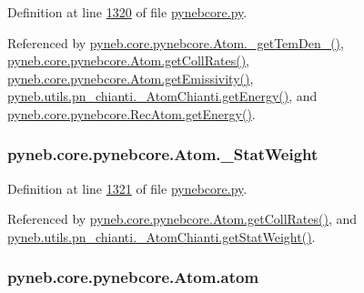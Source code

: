 Definition at line \hyperlink{pynebcore_8py_source_l01320}{1320} of file \hyperlink{pynebcore_8py_source}{pynebcore.\-py}.



Referenced by \hyperlink{pynebcore_8py_source_l01869}{pyneb.\-core.\-pynebcore.\-Atom.\-\_\-get\-Tem\-Den\-\_()}, \hyperlink{pynebcore_8py_source_l01394}{pyneb.\-core.\-pynebcore.\-Atom.\-get\-Coll\-Rates()}, \hyperlink{pynebcore_8py_source_l01782}{pyneb.\-core.\-pynebcore.\-Atom.\-get\-Emissivity()}, \hyperlink{pn__chianti_8py_source_l00366}{pyneb.\-utils.\-pn\-\_\-chianti.\-\_\-\-Atom\-Chianti.\-get\-Energy()}, and \hyperlink{pynebcore_8py_source_l02927}{pyneb.\-core.\-pynebcore.\-Rec\-Atom.\-get\-Energy()}.

\hypertarget{classpyneb_1_1core_1_1pynebcore_1_1_atom_a1e76c66b89eb327aeb4cdb1d8bd46fb5}{
\subsubsection[{\-\_\-\-Stat\-Weight}]{\setlength{\rightskip}{0pt plus 5cm}pyneb.\-core.\-pynebcore.\-Atom.\-\_\-\-Stat\-Weight\hspace{0.3cm}{\ttfamily [private]}}}\label{classpyneb_1_1core_1_1pynebcore_1_1_atom_a1e76c66b89eb327aeb4cdb1d8bd46fb5}


Definition at line \hyperlink{pynebcore_8py_source_l01321}{1321} of file \hyperlink{pynebcore_8py_source}{pynebcore.\-py}.



Referenced by \hyperlink{pynebcore_8py_source_l01394}{pyneb.\-core.\-pynebcore.\-Atom.\-get\-Coll\-Rates()}, and \hyperlink{pn__chianti_8py_source_l00343}{pyneb.\-utils.\-pn\-\_\-chianti.\-\_\-\-Atom\-Chianti.\-get\-Stat\-Weight()}.

\hypertarget{classpyneb_1_1core_1_1pynebcore_1_1_atom_a192f3e20446d7fba81d789bc705d6c71}{
\subsubsection[{atom}]{\setlength{\rightskip}{0pt plus 5cm}pyneb.\-core.\-pynebcore.\-Atom.\-atom}}\label{classpyneb_1_1core_1_1pynebcore_1_1_atom_a192f3e20446d7fba81d789bc705d6c71}



